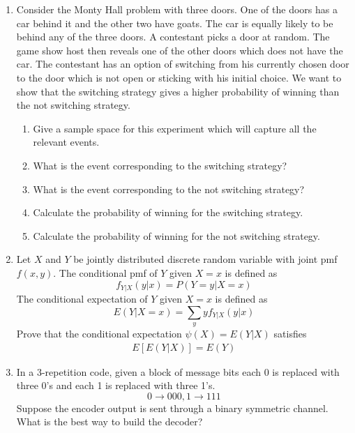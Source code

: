 \documentclass[10pt]{report}
\begin{document}
\begin{enumerate}
  \item Consider the Monty Hall problem with three doors. One of the doors has a car behind it and the other two have goats. The car is equally likely to be behind any of the three doors. A contestant picks a door at random. The game show host then reveals one of the other doors which does not have the car. The contestant has an option of switching from his currently chosen door to the door which is not open or sticking with his initial choice. We want to show that the switching strategy gives a higher probability of winning than the not switching strategy.
    \begin{enumerate}
      \item Give a sample space for this experiment which will capture all the relevant events.
      \item What is the event corresponding to the switching strategy?
      \item What is the event corresponding to the not switching strategy?
      \item Calculate the probability of winning for the switching strategy.
      \item Calculate the probability of winning for the not switching strategy.
    \end{enumerate}
  \item Let $X$ and $Y$ be jointly distributed discrete random variable with joint pmf $f(x,y)$. The conditional pmf of $Y$ given $X=x$ is defined as
    \begin{equation*}
      f_{Y|X} (y|x) = P(Y = y | X = x)
    \end{equation*}
  The conditional expectation of $Y$ given $X=x$ is defined as
    \begin{equation*}
      E(Y|X=x) = \sum_{y} y f_{Y|X}(y|x)
    \end{equation*}
  Prove that the conditional expectation $\psi(X) = E(Y|X)$ satisfies
    \begin{eqnarray*}
      E\left[ E(Y|X) \right] = E(Y)
    \end{eqnarray*}
  \item In a 3-repetition code, given a block of message bits each 0 is replaced with three 0's and each 1 is replaced with three 1's.
    \begin{equation*}
      0 \rightarrow 000, 1 \rightarrow 111
    \end{equation*}
    Suppose the encoder output is sent through a binary symmetric channel. What is the best way to build the decoder?

\end{enumerate}
\end{document}
